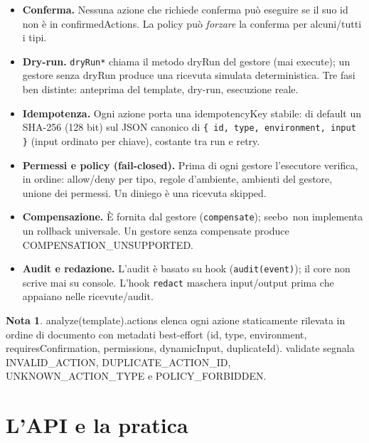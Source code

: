 \documentclass[11pt,a4paper]{book}
\let\code\lstinline
\newcommand{\ic}[1]{{\ttfamily #1}}
\theoremstyle{definition}
\newtheorem*{nota}{Nota}
\newcommand{\seebo}{\textsf{seebo}}
\begin{document}
{{{{\begin{itemize}
  \item \textbf{Conferma.} Nessuna azione che richiede conferma può eseguire se il
    suo \ic{id} non è in \ic{confirmedActions}. La policy può \emph{forzare} la
    conferma per alcuni/tutti i tipi.
  \item \textbf{Dry-run.} \code|dryRun*| chiama il metodo \ic{dryRun} del gestore
    (mai \ic{execute}); un gestore senza \ic{dryRun} produce una ricevuta simulata
    deterministica. Tre fasi ben distinte: anteprima del template, dry-run,
    esecuzione reale.
  \item \textbf{Idempotenza.} Ogni azione porta una \ic{idempotencyKey} stabile: di
    default un SHA-256 (128 bit) sul JSON canonico di
    \verb|{ id, type, environment, input }| (input ordinato per chiave), costante
    tra run e retry.
  \item \textbf{Permessi e policy (fail-closed).} Prima di ogni gestore l'esecutore
    verifica, in ordine: allow/deny per tipo, regole d'ambiente, ambienti del
    gestore, unione dei permessi. Un diniego è una ricevuta \ic{skipped}.
  \item \textbf{Compensazione.} È fornita dal gestore (\code|compensate|); \seebo\
    non implementa un rollback universale. Un gestore senza \ic{compensate} produce
    \ic{COMPENSATION\_UNSUPPORTED}.
  \item \textbf{Audit e redazione.} L'audit è basato su hook (\code|audit(event)|);
    il core non scrive mai su console. L'hook \code|redact| maschera input/output
    prima che appaiano nelle ricevute/audit.
\end{itemize}

\begin{nota}
\ic{analyze(template).actions} elenca ogni azione staticamente rilevata in ordine
di documento con metadati best-effort (\ic{id}, \ic{type}, \ic{environment},
\ic{requiresConfirmation}, \ic{permissions}, \ic{dynamicInput}, \ic{duplicateId}).
\ic{validate} segnala \ic{INVALID\_ACTION}, \ic{DUPLICATE\_ACTION\_ID},
\ic{UNKNOWN\_ACTION\_TYPE} e \ic{POLICY\_FORBIDDEN}.
\end{nota}

\part{L'API e la pratica}

}}}}
\end{document}
